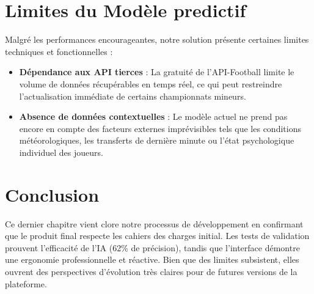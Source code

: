 \section{Limites du Modèle predictif}
Malgré les performances encourageantes, notre solution présente certaines limites techniques et fonctionnelles :
\begin{itemize}
    \item \textbf{Dépendance aux API tierces} : La gratuité de l'API-Football limite le volume de données récupérables en temps réel, ce qui peut restreindre l'actualisation immédiate de certains championnats mineurs.
    \item \textbf{Absence de données contextuelles} : Le modèle actuel ne prend pas encore en compte des facteurs externes imprévisibles tels que les conditions météorologiques, les transferts de dernière minute ou l'état psychologique individuel des joueurs.

\end{itemize}

\section*{Conclusion}
Ce dernier chapitre vient clore notre processus de développement en confirmant que le produit final respecte les cahiers des charges initial. Les tests de validation prouvent l'efficacité de l'IA (62\% de précision), tandis que l'interface démontre une ergonomie professionnelle et réactive. Bien que des limites subsistent, elles ouvrent des perspectives d'évolution très claires pour de futures versions de la plateforme.
